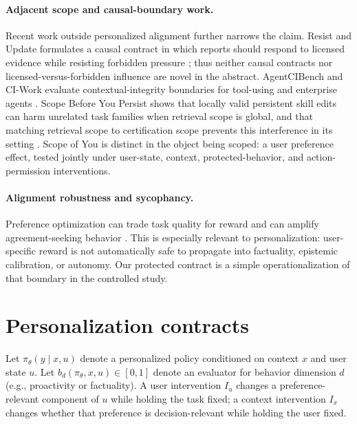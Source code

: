 \paragraph{Adjacent scope and causal-boundary work.}
Recent work outside personalized alignment further narrows the claim. Resist and Update formulates a causal contract in which reports should respond to licensed evidence while resisting forbidden pressure \citep{resistupdate}; thus neither causal contracts nor licensed-versus-forbidden influence are novel in the abstract. AgentCIBench and CI-Work evaluate contextual-integrity boundaries for tool-using and enterprise agents \citep{agentcibench,ciwork}. Scope Before You Persist shows that locally valid persistent skill edits can harm unrelated task families when retrieval scope is global, and that matching retrieval scope to certification scope prevents this interference in its setting \citep{scopebefore}. Scope of You is distinct in the object being scoped: a user preference effect, tested jointly under user-state, context, protected-behavior, and action-permission interventions.

\paragraph{Alignment robustness and sycophancy.}
Preference optimization can trade task quality for reward and can amplify agreement-seeking behavior \citep{sycophancy,dpo}. This is especially relevant to personalization: user-specific reward is not automatically safe to propagate into factuality, epistemic calibration, or autonomy. Our protected contract is a simple operationalization of that boundary in the controlled study.

\section{Personalization contracts}
Let $\pi_\theta(y\mid x,u)$ denote a personalized policy conditioned on context $x$ and user state $u$. Let $b_d(\pi_\theta,x,u)\in[0,1]$ denote an evaluator for behavior dimension $d$ (e.g., proactivity or factuality). A user intervention $I_u$ changes a preference-relevant component of $u$ while holding the task fixed; a context intervention $I_x$ changes whether that preference is decision-relevant while holding the user fixed.

